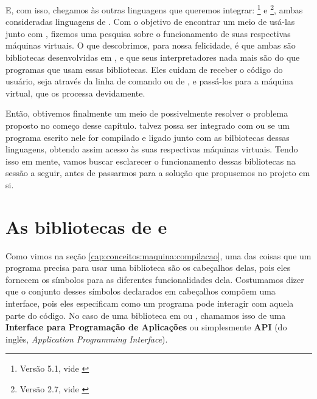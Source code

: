     E, com isso, chegamos às outras linguagens que queremos integrar:
    \footnote{Versão 5.1, vide \cite{lua:00}} e
    \footnote{Versão 2.7, vide \cite{python:00}}, ambas
    consideradas linguagens de \script{}. Com o objetivo de encontrar um meio de
    usá-las junto com \CXX{}, fizemos uma pesquisa sobre o funcionamento de suas
    respectivas máquinas virtuais. O que descobrimos, para nossa felicidade, é
    que ambas são bibliotecas desenvolvidas em \C{}, e que seus interpretadores
    nada mais são do que programas que usam essas bibliotecas. Eles cuidam de
    receber o código do usuário, seja através da linha de comando ou de
    , e passá-los para a máquina virtual, que os processa devidamente.
    
    Então, obtivemos finalmente um meio de possivelmente resolver o problema
    proposto no começo desse capítulo. \CXX{} talvez possa ser integrado com
     ou  se um programa escrito nele for compilado e
    ligado junto com as bilbiotecas dessas linguagens, obtendo assim acesso às
    suas respectivas máquinas virtuais. Tendo isso em mente, vamos buscar
    esclarecer o funcionamento dessas bibliotecas na sessão a seguir, antes de
    passarmos para a solução que propusemos no projeto em si.

  \section{As bibliotecas de  e }
  \label{cap:conceitos:apis}

    Como vimos na seção \ref{cap:conceitos:maquina:compilacao}, uma das coisas
    que um programa precisa para usar uma biblioteca são os cabeçalhos delas,
    pois eles fornecem os símbolos para as diferentes funcionalidades dela.
    Costumamos dizer que o conjunto desses símbolos declarados em cabeçalhos
    compõem uma interface, pois eles especificam como um programa pode interagir
    com aquela parte do código. No caso de uma biblioteca em \C{} ou \CXX{},
    chamamos isso de uma \textbf{Interface para Programação de Aplicações} ou
    simplesmente \textbf{API} (do inglês, \textit{Application Programming
    Interface})\footnotemark{}.



